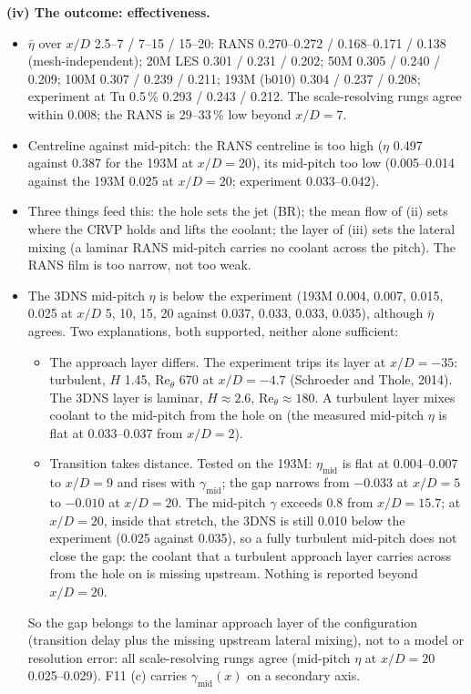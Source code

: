 \documentclass[10pt]{article}
\begin{document}
\textbf{(iv) The outcome: effectiveness.}
\begin{itemize}
\item $\bar\eta$ over $x/D$ 2.5--7 / 7--15 / 15--20: RANS 0.270--0.272 / 0.168--0.171 / 0.138 (mesh-independent);
  20M LES 0.301 / 0.231 / 0.202; 50M 0.305 / 0.240 / 0.209; 100M 0.307 / 0.239 / 0.211; 193M (b010) 0.304 /
  0.237 / 0.208; experiment at Tu 0.5\,\% 0.293 / 0.243 / 0.212. The scale-resolving rungs agree within 0.008; the RANS is
  29--33\,\% low beyond $x/D=7$.
\item Centreline against mid-pitch: the RANS centreline is too high ($\eta$ 0.497 against 0.387 for the 193M at
  $x/D=20$), its mid-pitch too low (0.005--0.014 against the 193M 0.025 at $x/D=20$; experiment
  0.033--0.042).
\item Three things feed this: the hole sets the jet (BR); the mean flow of (ii) sets where the CRVP holds and
  lifts the coolant; the layer of (iii) sets the lateral mixing (a laminar RANS mid-pitch carries no coolant
  across the pitch). The RANS film is too narrow, not too
  weak.
\item The 3DNS mid-pitch $\eta$ is below the experiment (193M 0.004, 0.007, 0.015, 0.025 at $x/D$ 5, 10, 15,
  20 against 0.037, 0.033, 0.033, 0.035), although $\bar\eta$ agrees. Two explanations, both supported, neither
  alone sufficient:
  \begin{itemize}
  \item The approach layer differs. The experiment trips its layer at $x/D=-35$: turbulent, $H$ 1.45,
    $\mathrm{Re}_\theta$ 670 at $x/D=-4.7$ (Schroeder and Thole, 2014). The 3DNS layer is laminar, $H\approx2.6$,
    $\mathrm{Re}_\theta\approx180$. A turbulent layer mixes coolant to the mid-pitch from the hole on (the
    measured mid-pitch $\eta$ is flat at 0.033--0.037 from $x/D=2$).
  \item Transition takes distance. Tested on the 193M: $\eta_{\mathrm{mid}}$ is flat at 0.004--0.007 to
    $x/D=9$ and rises with $\gamma_{\mathrm{mid}}$; the gap narrows from $-0.033$ at $x/D=5$ to $-0.010$ at
    $x/D=20$. The mid-pitch $\gamma$ exceeds 0.8 from $x/D=15.7$; at $x/D=20$, inside that stretch, the 3DNS is
    still 0.010 below the experiment (0.025 against 0.035), so a fully turbulent mid-pitch does not close the
    gap: the coolant that a turbulent approach layer carries across from the hole on is missing upstream.
    Nothing is reported beyond $x/D=20$.
  \end{itemize}
  So the gap belongs to the laminar approach layer of the configuration (transition delay plus the missing
  upstream lateral mixing), not to a model or resolution error: all scale-resolving rungs agree (mid-pitch
  $\eta$ at $x/D=20$ 0.025--0.029). F11 (c) carries $\gamma_{\mathrm{mid}}(x)$ on a secondary axis.
\end{itemize}
\end{document}
